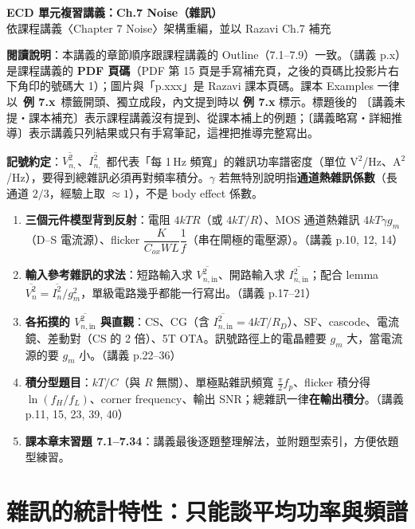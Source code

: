 \documentclass[11pt,a4paper]{article}
\newcommand{\Vsq}[1]{\overline{V^2_{n,\text{#1}}}}
\newcommand{\Isq}[1]{\overline{I^2_{n,\text{#1}}}}
\newcommand{\extag}[1]{\colorbox{extagbg}{\textcolor{extag}{\sffamily\bfseries\,例 #1\,}}}
\newcommand{\exref}[1]{\textcolor{extag}{\textbf{\sffamily 例 #1}}}
\newcommand{\lec}[1]{{\small\color{black!55}（講義 p.#1）}}
\newcommand{\supp}{{\small\color{black!55}〔講義未提・課本補充〕}}
\newcommand{\detail}{{\small\color{black!55}〔講義略寫・詳細推導〕}}
\begin{document}
\begin{center}{\LARGE\bfseries\sffamily ECD 單元複習講義：Ch.7 Noise（雜訊）}\\[0.3em]{\large 依課程講義〈Chapter 7 Noise〉架構重編，並以 Razavi Ch.7 補充}\end{center}

\textbf{閱讀說明}：本講義的章節順序跟課程講義的 Outline（7.1--7.9）一致。\lec{x} 是課程講義的 \textbf{PDF 頁碼}（PDF 第 15 頁是手寫補充頁，之後的頁碼比投影片右下角印的號碼大 1）；圖片與「p.xxx」是 Razavi 課本頁碼。課本 Examples 一律以 \extag{7.x} 標籤開頭、獨立成段，內文提到時以 \exref{7.x} 標示。標題後的 \supp 表示課程講義沒有提到、從課本補上的例題；\detail 表示講義只列結果或只有手寫筆記，這裡把推導完整寫出。

\textbf{記號約定}：$\Vsq{}$、$\Isq{}$ 都代表「每 1\,Hz 頻寬」的雜訊功率譜密度（單位 V$^2$/Hz、A$^2$/Hz），要得到總雜訊必須再對頻率積分。$\gamma$ 若無特別說明指\textbf{通道熱雜訊係數}（長通道 $2/3$，經驗上取 $\approx1$），不是 body effect 係數。

\begin{takeaway}[考試重點地圖]
\begin{enumerate}[leftmargin=2.2em]
  \item \textbf{三個元件模型背到反射}：電阻 $4kTR$（或 $4kT/R$）、MOS 通道熱雜訊 $4kT\gamma g_m$（D–S 電流源）、flicker $\dfrac{K}{C_{ox}WL}\dfrac1f$（串在閘極的電壓源）。\lec{10, 12, 14}
  \item \textbf{輸入參考雜訊的求法}：短路輸入求 $\Vsq{in}$、開路輸入求 $\Isq{in}$；配合 lemma $\overline{V_n^2}=\overline{I_n^2}/g_m^2$，單級電路幾乎都能一行寫出。\lec{17--21}
  \item \textbf{各拓撲的 $\Vsq{in}$ 與直觀}：CS、CG（含 $\Isq{in}=4kT/R_D$）、SF、cascode、電流鏡、差動對（CS 的 2 倍）、5T OTA。訊號路徑上的電晶體要 $g_m$ 大，當電流源的要 $g_m$ 小。\lec{22--36}
  \item \textbf{積分型題目}：$kT/C$（與 $R$ 無關）、單極點雜訊頻寬 $\frac{\pi}{2}f_p$、flicker 積分得 $\ln(f_H/f_L)$、corner frequency、輸出 SNR；總雜訊一律\textbf{在輸出積分}。\lec{11, 15, 23, 39, 40}
  \item \textbf{課本章末習題 7.1--7.34}：講義最後逐題整理解法，並附題型索引，方便依題型練習。
\end{enumerate}
\end{takeaway}

\section{雜訊的統計特性：只能談平均功率與頻譜}
\end{document}
